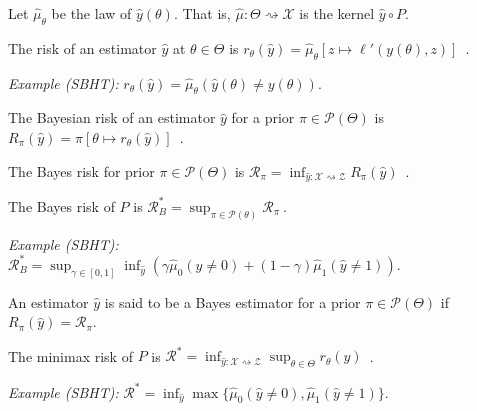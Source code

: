 Let $\hat{\mu}_\theta$ be the law of $\hat{y}(\theta)$. That is, $\hat{\mu} : \mathcal \Theta \rightsquigarrow \mathcal X$ is the kernel $\hat{y} \circ P$.

\begin{definition}[Risk]
  \label{def:risk}
  The risk of an estimator $\hat{y}$ at $\theta \in \Theta$ is $r_\theta(\hat{y}) = \hat{\mu}_\theta\left[z \mapsto \ell'(y(\theta), z)\right]$~.
\end{definition}

\emph{Example (SBHT):} $r_\theta(\hat{y}) = \hat{\mu}_\theta(\hat{y}(\theta) \ne y(\theta))$.


\begin{definition}
  \label{def:bayesianRisk}
  The Bayesian risk of an estimator $\hat{y}$ for a prior $\pi \in \mathcal P(\Theta)$ is $R_\pi(\hat{y}) = \pi\left[\theta \mapsto r_\theta(\hat{y})\right]$~.
\end{definition}


\begin{definition}
  \label{def:bayesRisk}
  The Bayes risk for prior $\pi \in \mathcal P(\Theta)$ is $\mathcal R_\pi = \inf_{\hat{y} : \mathcal X \rightsquigarrow \mathcal Z} R_\pi(\hat{y})$~.

  The Bayes risk of $P$ is $\mathcal R^*_B = \sup_{\pi \in \mathcal P(\theta)} \mathcal R_\pi \: .$
\end{definition}

\emph{Example (SBHT):} $\mathcal R^*_B = \sup_{\gamma \in [0,1]}\inf_{\hat{y}}\left(\gamma \hat{\mu}_0(\hat{y} \ne 0) + (1 - \gamma) \hat{\mu}_1(\hat{y} \ne 1)\right)$.

\begin{definition}
  \label{def:bayesEstimator}
  An estimator $\hat{y}$ is said to be a Bayes estimator for a prior $\pi \in \mathcal P(\Theta)$ if $R_\pi(\hat{y}) = \mathcal R_\pi$.
\end{definition}

\begin{definition}
  \label{def:minimaxRisk}
  The minimax risk of $P$ is $\mathcal R^* = \inf_{\hat{y} : \mathcal X \rightsquigarrow \mathcal Z} \sup_{\theta \in \Theta} r_\theta(\hat{y})$~.
\end{definition}

\emph{Example (SBHT):} $\mathcal R^* = \inf_{\hat{y}} \max\{\hat{\mu}_0(\hat{y} \ne 0), \hat{\mu}_1(\hat{y} \ne 1)\}$.

